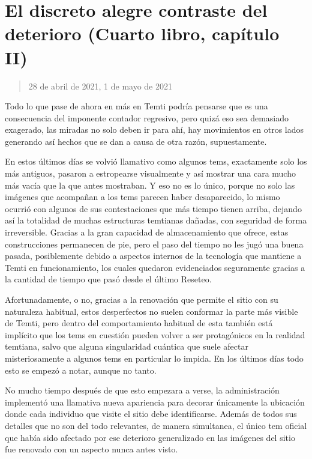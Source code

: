 \documentclass[
]{book}
\begin{document}
\hypertarget{el-discreto-alegre-contraste-del-deterioro-cuarto-libro-capuxedtulo-ii}{%
\section{El discreto alegre contraste del deterioro (Cuarto libro, capítulo II)}\label{el-discreto-alegre-contraste-del-deterioro-cuarto-libro-capuxedtulo-ii}}

\begin{quote}
28 de abril de 2021, 1 de mayo de 2021
\end{quote}

Todo lo que pase de ahora en más en Temti podría pensarse que es una consecuencia del imponente contador regresivo, pero quizá eso sea demasiado exagerado, las miradas no solo deben ir para ahí, hay movimientos en otros lados generando así hechos que se dan a causa de otra razón, supuestamente.

En estos últimos días se volvió llamativo como algunos tems, exactamente solo los más antiguos, pasaron a estropearse visualmente y así mostrar una cara mucho más vacía que la que antes mostraban. Y eso no es lo único, porque no solo las imágenes que acompañan a los tems parecen haber desaparecido, lo mismo ocurrió con algunos de sus contestaciones que más tiempo tienen arriba, dejando así la totalidad de muchas estructuras temtianas dañadas, con seguridad de forma irreversible. Gracias a la gran capacidad de almacenamiento que ofrece, estas construcciones permanecen de pie, pero el paso del tiempo no les jugó una buena pasada, posiblemente debido a aspectos internos de la tecnología que mantiene a Temti en funcionamiento, los cuales quedaron evidenciados seguramente gracias a la cantidad de tiempo que pasó desde el último Reseteo.

Afortunadamente, o no, gracias a la renovación que permite el sitio con su naturaleza habitual, estos desperfectos no suelen conformar la parte más visible de Temti, pero dentro del comportamiento habitual de esta también está implícito que los tems en cuestión pueden volver a ser protagónicos en la realidad temtiana, salvo que alguna singularidad cuántica que suele afectar misteriosamente a algunos tems en particular lo impida. En los últimos días todo esto se empezó a notar, aunque no tanto.

No mucho tiempo después de que esto empezara a verse, la administración implementó una llamativa nueva apariencia para decorar únicamente la ubicación donde cada individuo que visite el sitio debe identificarse. Además de todos sus detalles que no son del todo relevantes, de manera simultanea, el único tem oficial que había sido afectado por ese deterioro generalizado en las imágenes del sitio fue renovado con un aspecto nunca antes visto.
\end{document}
